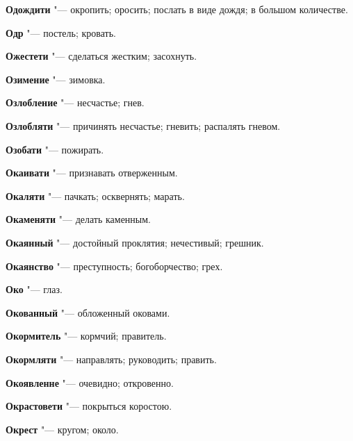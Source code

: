 \begin{mymulticols}{2}
\noindent\textbf{Одождити} "--- окропить; оросить; послать в виде дождя; в большом количестве. 




\noindent\textbf{Одр} "--- постель; кровать. 




\noindent\textbf{Ожестети} "--- сделаться жестким; засохнуть. 




\noindent\textbf{Озимение} "--- зимовка. 




\noindent\textbf{Озлобление} "--- несчастье; гнев. 




\noindent\textbf{Озлобляти} "--- причинять несчастье; гневить; распалять гневом. 




\noindent\textbf{Озобати} "--- пожирать. 




\noindent\textbf{Окаивати} "--- признавать отверженным. 




\noindent\textbf{Окаляти} "--- пачкать; осквернять; марать. 




\noindent\textbf{Окаменяти} "--- делать каменным. 




\noindent\textbf{Окаянный} "--- достойный проклятия; нечестивый; грешник. 




\noindent\textbf{Окаянство} "--- преступность; богоборчество; грех. 




\noindent\textbf{Око} "--- глаз. 




\noindent\textbf{Окованный} "--- обложенный оковами. 




\noindent\textbf{Окормитель} "--- кормчий; правитель. 




\noindent\textbf{Окормляти} "--- направлять; руководить; править. 




\noindent\textbf{Окоявленне} "--- очевидно; откровенно. 




\noindent\textbf{Окрастовети} "--- покрыться коростою. 




\noindent\textbf{Окрест} "--- кругом; около. 





\end{mymulticols}
